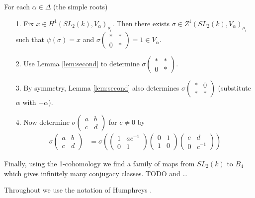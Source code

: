 For each $\alpha \in \Delta$ (the simple roots)
\begin{itemize}
	\item[1.] Fix $x\in H^1(SL_2(k), V_\alpha)_{\rho_r}$. Then there exists $\sigma\in Z^1(SL_2(k), V_\alpha)_{\rho_r}$ such that $\psi(\sigma) = x$ and $\sigma\left(\begin{matrix}* & *\\0 & *\end{matrix}\right) = 1 \in V_\alpha$.
	\item[2.] Use Lemma \ref{lem:second} to determine $\sigma\left(\begin{matrix}* & *\\0 & *\end{matrix}\right)$. 
	\item[3.] By symmetry, Lemma \ref{lem:second} also determines $\sigma\left(\begin{matrix}* & 0\\ * & *\end{matrix}\right)$ (substitute $\alpha$ with $-\alpha$).
	\item[4.] Now determine $\sigma\left(\begin{matrix}a & b\\c & d\end{matrix}\right)$ for $c \neq 0$ by
		\begin{align*}
			\sigma\left(\begin{matrix}a & b\\c & d\end{matrix}\right) &= \sigma\left(
				\left(\begin{matrix}1 & ac^{-1}\\0 & 1\end{matrix}\right)
				\left(\begin{matrix}0 & 1\\1 & 0\end{matrix}\right)
				\left(\begin{matrix}c & d\\0 & c^{-1}\end{matrix}\right)
			\right)
		\end{align*}
\end{itemize}

Finally, using the 1-cohomology we find a family of maps from $SL_2(k)$ to $B_4$ which gives infinitely many conjugacy classes. TODO and \ldots

Throughout we use the notation of Humphreys \cite[Chapter XI]{humphreys1975linear}.

